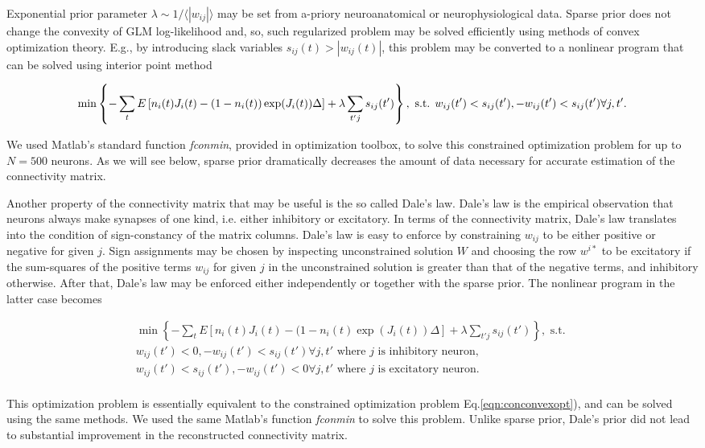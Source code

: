 Exponential prior parameter $\lambda\sim 1/\langle|w_{ij}|\rangle$ may be set from a-priory neuroanatomical or neurophysiological data. Sparse prior does not change the convexity of GLM log-likelihood and, so, such regularized problem may be solved efficiently using methods of convex optimization theory. E.g., by introducing slack variables $s_{ij}(t)>|w_{ij}(t)|$, this problem may be converted to a nonlinear program that can be solved using interior point method

\begin{equation} \label{eqn:conconvexopt}
\min \left\{-\sum\limits_t E\left[ n_i(t) J_i(t) - (1-n_i(t)) \exp(J_i(t)) \Delta \right]+\lambda \sum\limits_{t'j}s_{ij}(t')\right\}, \text{ s.t. } \\
w_{ij}(t')<s_{ij}(t'), -w_{ij}(t')<s_{ij}(t') \forall j, t'.
\end{equation}

We used Matlab's standard function {\em fconmin}, provided in optimization toolbox, to solve this constrained optimization problem for up to $N=500$ neurons. As we will see below, sparse prior dramatically decreases the amount of data necessary for accurate estimation of the connectivity matrix.

Another property of the connectivity matrix that may be useful is the so called Dale's law. Dale's law is the empirical observation that neurons always make synapses of one kind, i.e. either inhibitory or excitatory. In terms of the connectivity matrix, Dale's law translates into the condition of sign-constancy of the matrix columns. Dale's law is easy to enforce by constraining $w_{ij}$ to be either positive or negative for given $j$.  Sign assignments may be chosen by inspecting unconstrained solution $W$ and choosing the row $w^{i*}$ to be excitatory if the sum-squares of the positive terms $w_{ij}$ for given $j$ in the unconstrained solution is greater than that of the negative terms, and inhibitory otherwise.  After that, Dale's law may be enforced either independently or together with the sparse prior.  The nonlinear program in the latter case becomes

\begin{equation}
\begin{array}{l}
\min \left\{-\sum\limits_t E\left[ n_i(t) J_i(t) - (1-n_i(t) \exp(J_i(t)) \Delta \right]+\lambda \sum\limits_{t'j}s_{ij}(t')\right\}, \text{ s.t. }\\
w_{ij}(t')<0, -w_{ij}(t')<s_{ij}(t') \forall j, t'\text{ where }j\text{ is inhibitory neuron}, \\
w_{ij}(t')<s_{ij}(t'), -w_{ij}(t')<0 \forall j, t'\text{ where }j\text{ is excitatory neuron}. \\
\end{array}
\end{equation}

This optimization problem is essentially equivalent to the constrained optimization problem Eq.\eqref{eqn:conconvexopt}), and can be solved using the same methods. We used the same Matlab's function {\em fconmin} to solve this problem. Unlike sparse prior, Dale's prior did not lead to substantial improvement in the reconstructed connectivity matrix.
